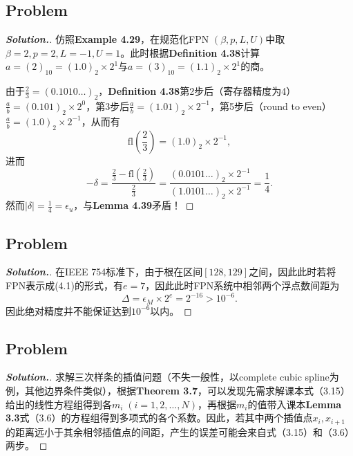 \documentclass{ctexart}
\begin{document}
\begin{sloppypar}
\subsection*{Problem \uppercase\expandafter{}}
\begin{proof}[\textbf{Solution.}]
仿照\textbf{Example 4.29}，在规范化FPN $(\beta,p,L,U)$中取$\beta = 2, p = 2, L=-1,U = 1$。此时根据\textbf{Definition 4.38}计算$a = (2)_{10} = (1.0)_2 \times 2^1$与$a = (3)_{10} = (1.1)_2 \times 2^1$的商。

由于$\frac{2}{3}= (0.1010\dots)_2$，\textbf{Definition 4.38}第2步后（寄存器精度为4）$\frac{a}{b} = (0.101)_2 \times 2^0$，第3步后$\frac{a}{b} = (1.01)_2 \times 2^{-1}$，第5步后（round to even）$\frac{a}{b} = (1.0)_2 \times 2^{-1}$，从而有
\begin{equation}
    \mathrm{fl}(\frac{2}{3}) = (1.0)_2 \times 2^{-1},
\end{equation}
进而
\begin{equation}
    -\delta = \frac{\frac{2}{3}-\mathrm{fl}(\frac{2}{3})}{\frac{2}{3}} = \frac{(0.0101\dots)_2 \times 2^{-1}}{(1.0101\dots)_2 \times 2^{-1}} = \frac{1}{4}.
\end{equation}
然而$|\delta| = \frac{1}{4} = \epsilon_u$，与\textbf{Lemma 4.39}矛盾！
\end{proof}
\subsection*{Problem \uppercase\expandafter{}}
\begin{proof}[\textbf{Solution.}]
在IEEE 754标准下，由于根在区间$[128,129]$之间，因此此时若将FPN表示成(4.1)的形式，有$e = 7$，因此此时FPN系统中相邻两个浮点数间距为
\begin{equation}
    \Delta = \epsilon_M \times 2^{e} = 2^{-16} > 10^{-6}.
\end{equation}
因此绝对精度并不能保证达到$10^{-6}$以内。
\end{proof}
\subsection*{Problem \uppercase\expandafter{}}
\begin{proof}[\textbf{Solution.}]
求解三次样条的插值问题（不失一般性，以complete cubic spline为例，其他边界条件类似），根据\textbf{Theorem 3.7}，可以发现先需求解课本式（3.15）给出的线性方程组得到各$m_i\;(i=1,2,\dots,N)$，再根据$m_i$的值带入课本\textbf{Lemma 3.3}式（3.6）的方程组得到多项式的各个系数。因此，若其中两个插值点$x_i,x_{i+1}$的距离远小于其余相邻插值点的间距，产生的误差可能会来自式（3.15）和（3.6）两步。


\end{proof}
\end{sloppypar}
\end{document}

